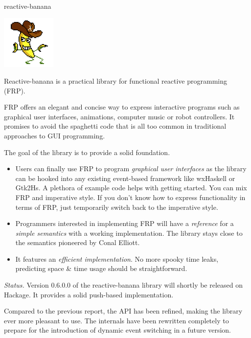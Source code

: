 \begin{hcarentry}[updated]{reactive-banana}
\makeheader

\begin{center}
\includegraphics[width=0.2\textwidth]{html/banana.jpg}
\end{center}

Reactive-banana is a practical library for functional reactive programming (FRP).

FRP offers an elegant and concise way to express interactive programs such as graphical user interfaces, animations, computer music or robot controllers. It promises to avoid the spaghetti code that is all too common in traditional approaches to GUI programming.

The goal of the library is to provide a solid foundation.
\begin{itemize}
\item Users can finally use FRP to program \emph{graphical user interfaces} as the library can be hooked into any existing event-based framework like wxHaskell or Gtk2Hs. A plethora of example code helps with getting started. You can mix FRP and imperative style. If you don't know how to express functionality in terms of FRP, just temporarily switch back to the imperative style.
\item Programmers interested in implementing FRP will have a \emph{reference} for a \emph{simple semantics} with a working implementation. The library stays close to the semantics pioneered by Conal Elliott.
\item It features an \emph{efficient implementation}. No more spooky time leaks, predicting space \& time usage should be straightforward.
\end{itemize}

\emph{Status.} Version 0.6.0.0 of the reactive-banana library will shortly be released on Hackage. It provides a solid push-based implementation.

Compared to the previous report, the API has been refined, making the library ever more pleasant to use. The internals have been rewritten completely to prepare for the introduction of dynamic event switching in a future version.


\end{hcarentry}
